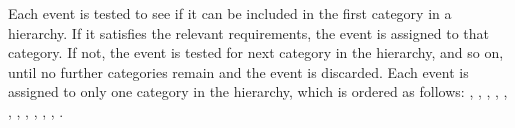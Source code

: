 Each event is tested to see if it can be included in the first category in a hierarchy. If it satisfies the relevant requirements, the event is assigned to that category. If not, the event is tested for next category in the hierarchy, and so on, until no further categories remain and the event is discarded. Each event is assigned to only one category in the hierarchy, which is ordered as follows: \TTHLeptonicTag, \VHTightLeptonicTag, \VHLooseLeptonicTag, \VHMETTag, \TTHHadronicTag, \VHHadronicTag, , , , , , .


